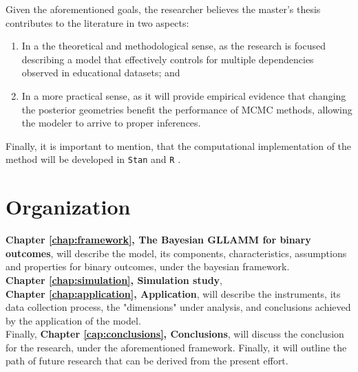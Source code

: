 \noindent Given the aforementioned goals, the researcher believes the master's thesis contributes to the literature in two aspects: 

\begin{enumerate}
	\item In a the theoretical and methodological sense, as the research is focused describing a model that effectively controls for multiple dependencies observed in educational datasets; and 
	
	\item In a more practical sense, as it will provide empirical evidence that changing the posterior geometries benefit the performance of MCMC methods, allowing the modeler to arrive to proper inferences.
\end{enumerate}

\noindent Finally, it is important to mention, that the computational implementation of the method will be developed in \texttt{Stan} \cite{Stan2020} and \texttt{R} \cite{R2015, RStan2020}.



\section{Organization}

\textbf{Chapter \ref{chap:framework}, The Bayesian GLLAMM for binary outcomes}, will describe the model, its components, characteristics, assumptions and properties for binary outcomes, under the bayesian framework. \\

\noindent \textbf{Chapter \ref{chap:simulation}, Simulation study}, \\

\noindent \textbf{Chapter \ref{chap:application}, Application}, will describe the instruments, its data collection process, the "dimensions" under analysis, and conclusions achieved by the application of the model. \\

\noindent Finally, \textbf{Chapter \ref{cap:conclusions}, Conclusions}, will discuss the conclusion for the research, under the aforementioned framework. Finally, it will outline the path of future research that can be derived from the present effort.

